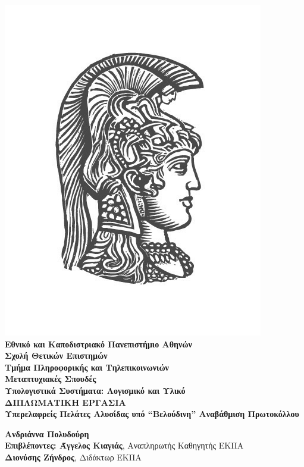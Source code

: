 \begin{center}
    
    \includegraphics[scale=0.8]{figures/logo_uoa.jpg}\\
    {\Large \textbf{Εθνικό και Καποδιστριακό Πανεπιστήμιο Αθηνών}} \\ 
    {\large \textbf{Σχολή Θετικών Επιστημών}} \\ 
    {\large \textbf{Τμήμα Πληροφορικής και Τηλεπικοινωνιών}}\\
    \vspace{1cm}
    {\large \textbf{Μεταπτυχιακές Σπουδές}} \\ 
    {\large \textbf{Υπολογιστικά Συστήματα: Λογισμικό και Υλικό}}\\
    \vspace{20mm}
    {\Large \textbf{ΔΙΠΛΩΜΑΤΙΚΗ ΕΡΓΑΣΙΑ}}\\
    \vspace{0.7cm}
    {\textbf{\LARGE Υπερελαφρείς Πελάτες Αλυσίδας υπό ``Βελούδινη'' Αναβάθμιση Πρωτοκόλλου}}\\
    \vspace{2cm}

    \textbf{\large Ανδριάννα Πολυδούρη} \\ 
    \vspace{2.0cm} 
    \textbf{\large Επιβλέποντες: Άγγελος Κιαγιάς}\large , Αναπληρωτής Καθηγητής ΕΚΠΑ\\
    \hspace{0.77cm}
    \textbf{\large Διονύσης Ζήνδρος}\large, Διδάκτωρ ΕΚΠΑ
    \vspace{2cm}

    \date{\textbf{Αθήνα}, \\ \textbf{Ιούνιος 2020}}
    \pagebreak
\end{center}